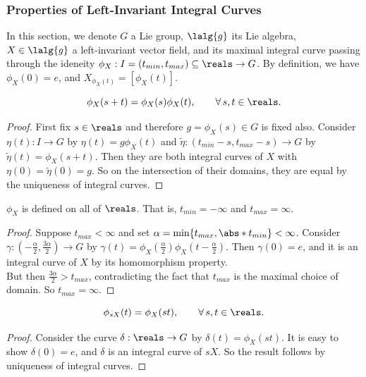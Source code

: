 \documentclass[../main.tex]{subfiles}
\begin{document}
\subsubsection{Properties of Left-Invariant Integral Curves}
In this section, we denote \(G\) a Lie group, \(\lalg{g}\) its Lie
algebra, \(X \in \lalg{g}\) a left-invariant vector field, and its
maximal integral curve passing through the ideneity \(\phi_X : I =
(t_{min}, t_{max}) \subseteq \reals \to G\).
By definition, we have \(\phi_X(0) = e\), and \(X_{\phi_X(t)} =
[\phi_X(t)]\).
\begin{theorem}
\label{thm:Left-Invariant-Integral-Curve-is-Lie-Homomorphism}
    \[
    \phi_X(s+t) = \phi_X(s)\phi_X(t), \qquad \forall\, s, t \in \reals.
    \]
\end{theorem}
\begin{proof}
    First fix \(s \in \reals\) and therefore \(g = \phi_X(s) \in G\) is
    fixed also. Consider \(\eta(t) : I \to G\) by \(\eta(t) =
    g\phi_X(t)\) and \(\tilde{\eta} : (t_{min}-s, t_{max}-s) \to G\) by 
    \(\tilde{\eta}(t) = \phi_X(s+t)\). Then they are both integral curves
    of \(X\) with \(\eta(0) = \tilde{\eta}(0) = g\). So on the
    intersection of their domains, they are equal by the uniqueness of
    integral curves.
\end{proof}
\begin{theorem}
\label{thm:Maximality-of-Left-Invariant-Integral-Curve}
    \(\phi_X\) is defined on all of \(\reals\). That is, \(t_{min} =
    -\infty\) and \(t_{max} = \infty\).
\end{theorem}
\begin{proof}
    Suppose \(t_{max} < \infty\) and set \(\alpha = \min \{t_{max},
    \abs*{t_{min}}\} < \infty\). Consider \\\(\gamma : \left(
-\frac{\alpha}{2}, \frac{3\alpha}{2} \right) \to G\) by \(\gamma(t) =
\phi_X\left( \frac{\alpha}{2} \right) \phi_X\left( t-\frac{\alpha}{2}
\right) \). Then \(\gamma(0) = e\), and it is an integral curve of \(X\)
by its homomorphism property.\\
    But then \(\frac{3\alpha}{2} > t_{max}\), contradicting the fact that
    \(t_{max}\) is the maximal choice of domain. So \(t_{max} = \infty\).
\end{proof}
\begin{theorem}
\label{thm:Exponential-Property-of-Left-Invariant-Integral-Curve}
    \[
    \phi_{sX}(t) = \phi_X(st), \qquad \forall\, s, t \in \reals.
    \]
\end{theorem}
\begin{proof}
    Consider the curve \(\delta : \reals \to G\) by \(\delta(t) =
    \phi_X(st)\). It is easy to show \(\delta(0) = e\), and \(\delta\) is
    an integral curve of \(sX\). So the result follows by uniqueness of
    integral curves.
\end{proof}
\end{document}

